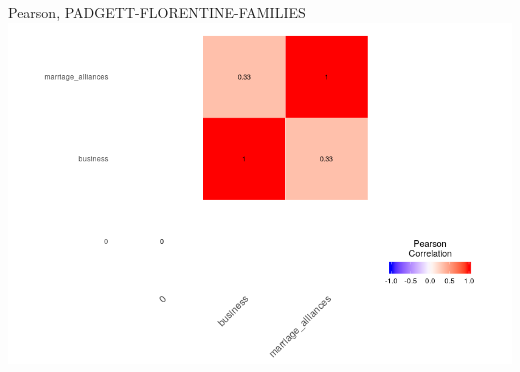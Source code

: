 \documentclass{beamer}
\begin{document}
\begin{frame}{Pearson, PADGETT-FLORENTINE-FAMILIES} 
\includegraphics[scale=0.46]{heamapPearson3}
\end{frame}
\end{document}
